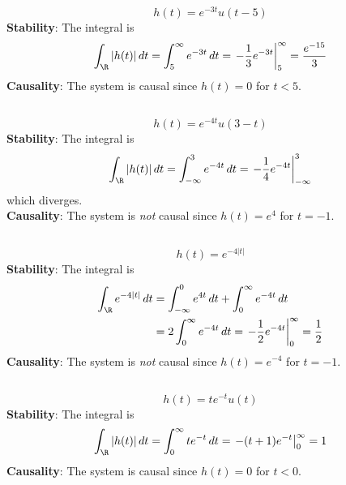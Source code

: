 \documentclass{article}
\begin{document}
\begin{equation}
    h(t) = e^{-3t} u(t - 5)
\end{equation}
\textbf{Stability}: The integral is
\begin{equation}
    \int_{\R} |h(t)| \, dt = \int_5^\infty e^{-3t} \, dt = \left.-\frac{1}{3} e^{-3t}\right|_5^\infty = \frac{e^{-15}}{3}
\end{equation}
\textbf{Causality}: The system is causal since \(h(t) = 0\) for \(t < 5\).

\subsection{}

\begin{equation}
    h(t) = e^{-4t} u(3 - t)
\end{equation}
\textbf{Stability}: The integral is
\begin{equation}
    \int_{\R} |h(t)| \, dt = \int_{-\infty}^3 e^{-4t} \, dt = \left.-\frac{1}{4} e^{-4t}\right|_{-\infty}^3
\end{equation}
which diverges. \\
\textbf{Causality}: The system is \emph{not} causal since \(h(t) = e^4\) for \(t = -1\).

\subsection{}

\begin{equation}
    h(t) = e^{-4|t|}
\end{equation}
\textbf{Stability}: The integral is
\begin{align}
    \int_{\R} e^{-4|t|} \, dt &= \int_{-\infty}^0 e^{4t} \, dt + \int_0^\infty e^{-4t} \, dt \\
    &= 2 \int_0^\infty e^{-4t} \, dt = \left.-\frac{1}{2} e^{-4t}\right|_0^\infty = \frac{1}{2}
\end{align}
\textbf{Causality}: The system is \emph{not} causal since \(h(t) = e^{-4}\) for \(t = -1\).

\subsection{}

\begin{equation}
    h(t) = t e^{-t} u(t)
\end{equation}
\textbf{Stability}: The integral is
\begin{align}
    \int_{\R} |h(t)| \, dt = \int_0^\infty t e^{-t} \, dt = \left.-(t + 1) e^{-t}\right|_0^\infty = 1
\end{align}
\textbf{Causality}: The system is causal since \(h(t) = 0\) for \(t < 0\).
\end{document}
